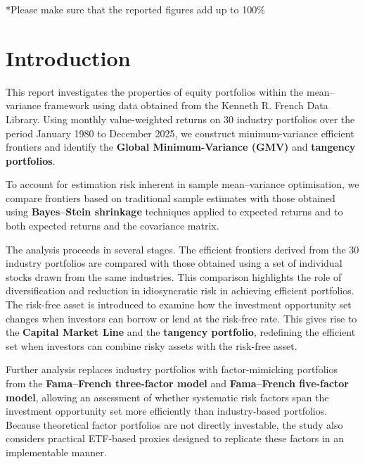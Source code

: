 \documentclass[11pt]{exam}
\begin{document}
\vspace{0.5em}

\noindent
\footnotesize{*Please make sure that the reported figures add up to 100\%}


\newpage
\tableofcontents
{}
\setcounter{page}{1}

\newpage
\normalsize
\section*{Introduction} 
This report investigates the properties of equity portfolios within the mean–variance framework using data obtained from the Kenneth R. French Data Library. Using monthly value-weighted returns on 30 industry portfolios over the period January 1980 to December 2025, we construct minimum-variance efficient frontiers and identify the \textbf{Global Minimum-Variance (GMV)} and \textbf{tangency portfolios}. 

\noindent To account for estimation risk inherent in sample mean–variance optimisation, we compare frontiers based on traditional sample estimates with those obtained using \textbf{Bayes–Stein shrinkage} techniques applied to expected returns and to both expected returns and the covariance matrix.

\noindent The analysis proceeds in several stages. The efficient frontiers derived from the 30 industry portfolios are compared with those obtained using a set of individual stocks drawn from the same industries. This comparison highlights the role of diversification and reduction in idiosyncratic risk in achieving efficient portfolios. The risk-free asset is introduced to examine how the investment opportunity set changes when investors can borrow or lend at the risk-free rate. This gives rise to the \textbf{Capital Market Line} and the \textbf{tangency portfolio}, redefining the efficient set when investors can combine risky assets with the risk-free asset.

\noindent Further analysis replaces industry portfolios with factor-mimicking portfolios from the \textbf{Fama--French three-factor model} and \textbf{Fama--French five-factor model}, allowing an assessment of whether systematic risk factors span the investment opportunity set more efficiently than industry-based portfolios. Because theoretical factor portfolios are not directly investable, the study also considers practical ETF-based proxies designed to replicate these factors in an implementable manner.
\end{document}
